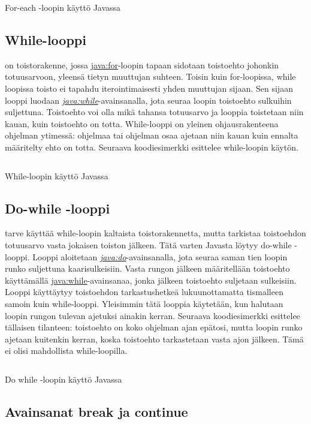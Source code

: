 \documentclass{tufte-book}
\newcommand{\java}[1]{\underline{\gls{java:#1}}}
\newcommand{\newjava}[1]{\textit{\java{#1}}}
\newcommand{\code}[3]{
\begin{listing}
    \inputminted{java}{OhjelmointiopasEsimerkit/src/#1/#2.java}
    \caption{#3}
    \label{Java-#1-#2}
\end{listing}
}
\begin{document}
\code{week3/basicexamples}{ForEachLoop}{For-each -loopin käyttö Javassa}

\subsection{While-looppi}
\label{while}

 on toistorakenne, jossa \java{for}-loopin tapaan sidotaan toistoehto
johonkin totuusarvoon, yleensä tietyn muuttujan suhteen. Toisin kuin for-loopissa, while loopissa
toisto ei tapahdu iterointimaisesti yhden muuttujan sijaan. Sen sijaan looppi luodaan
\newjava{while}-avainsanalla, jota seuraa loopin toistoehto sulkuihin suljettuna. Toistoehto
voi olla mikä tahansa totuusarvo ja looppia toistetaan niin kauan, kuin toistoehto on totta.
While-looppi on yleinen ohjausrakenteena ohjelman ytimessä: ohjelmaa tai ohjelman osaa ajetaan
niin kauan kuin ennalta määritelty ehto on totta. Seuraava koodiesimerkki esittelee while-loopin
käytön.

\code{week3/basicexamples}{BasicWhileLoop}{While-loopin käyttö Javassa}

\subsection{Do-while -looppi}
\label{do while}

 tarve käyttää while-loopin kaltaista toistorakennetta, mutta
tarkistaa toistoehdon totuusarvo vasta jokaisen toiston jälkeen. Tätä varten Javasta löytyy 
do-while -looppi. Looppi aloitetaan \newjava{do}-avainsanalla, jota seuraa saman tien loopin
runko suljettuna kaarisulkeisiin. Vasta rungon jälkeen määritellään toistoehto käyttämällä
\java{while}-avainsanaa, jonka jälkeen toistoehto suljetaan sulkeisiin. Looppi käyttäytyy
toistoehdon tarkastushetkeä lukuunottamatta tismalleen samoin kuin while-looppi. Yleisimmin tätä
looppia käytetään, kun halutaan loopin rungon tulevan ajetuksi ainakin kerran. Seuraava
koodiesimerkki esittelee tällaisen tilanteen: toistoehto on koko ohjelman ajan epätosi, mutta
loopin runko ajetaan kuitenkin kerran, koska toistoehto tarkastetaan vasta ajon jälkeen. Tämä ei
olisi mahdollista while-loopilla.

\code{week3/basicexamples}{DoWhileLoop}{Do while -loopin käyttö Javassa}

\subsection{Avainsanat break ja continue}
\label{break continue}
\end{document}
